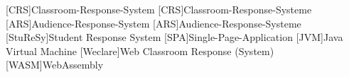 \begin{acronym}[StuReSy]
    [CRS]{Classroom-Response-System}
    [CRS]{Classroom-Response-Systeme}
    [ARS]{Audience-Response-System}
    [ARS]{Audience-Response-Systeme}
    [StuReSy]{Student Response System}
    [SPA]{Single-Page-Application}
    [JVM]{Java Virtual Machine}
    [Weclare]{Web Classroom Response (System)}
    [WASM]{WebAssembly}
\end{acronym}
